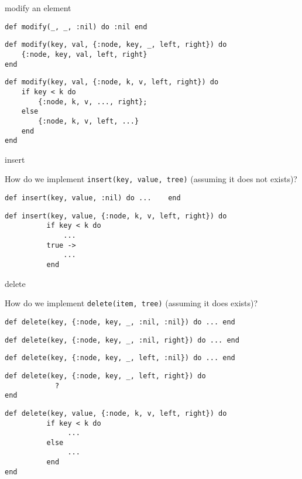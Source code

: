 \begin{frame}[fragile]{modify an element}

\begin{verbatim}
def modify(_, _, :nil) do :nil end
\end{verbatim}
\pause
\begin{verbatim}
def modify(key, val, {:node, key, _, left, right}) do 
    {:node, key, val, left, right}
end
\end{verbatim}
\pause
\begin{verbatim}
def modify(key, val, {:node, k, v, left, right}) do 
    if key < k do
        {:node, k, v, ..., right};
    else
        {:node, k, v, left, ...}
    end
end
\end{verbatim}

\end{frame}


\begin{frame}[fragile]{insert}

How do we implement {\tt insert(key, value, tree)} (assuming it does not exists)?

\pause\vspace{20pt}

\begin{verbatim}
def insert(key, value, :nil) do ...    end
\end{verbatim}
\pause
\begin{verbatim}
def insert(key, value, {:node, k, v, left, right}) do 
          if key < k do
              ... 
          true -> 
              ...
          end
\end{verbatim}

\end{frame}


\begin{frame}[fragile]{delete}

How do we implement {\tt delete(item, tree)} (assuming it does exists)?

\pause\vspace{10pt}

\begin{verbatim}
def delete(key, {:node, key, _, :nil, :nil}) do ... end
\end{verbatim}
\pause
\begin{verbatim}
def delete(key, {:node, key, _, :nil, right}) do ... end
\end{verbatim}
\pause
\begin{verbatim}
def delete(key, {:node, key, _, left, :nil}) do ... end
\end{verbatim}
\pause
\begin{verbatim}
def delete(key, {:node, key, _, left, right}) do 
            ?
end
\end{verbatim}
\pause
\begin{verbatim}
def delete(key, value, {:node, k, v, left, right}) do 
          if key < k do
               ...
          else
               ...
          end
end
\end{verbatim}
\end{frame}

